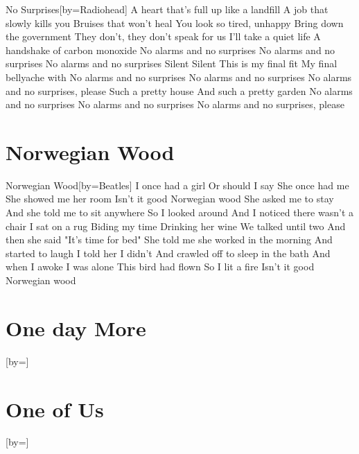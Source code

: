 \documentclass{article}
\begin{document}
\begin{songs}{}
\begin{song}{No Surprises}[by={Radiohead}]
\beginverse
A heart that's full up like a landfill
A job that slowly kills you
Bruises that won't heal
\endverse
\beginverse
You look so tired, unhappy
Bring down the government
They don't, they don't speak for us
\endverse
\beginverse
I'll take a quiet life
A handshake of carbon monoxide
No alarms and no surprises
No alarms and no surprises
No alarms and no surprises
Silent
Silent
\endverse
\beginverse
This is my final fit
My final bellyache with
No alarms and no surprises
No alarms and no surprises
No alarms and no surprises, please
\endverse
\beginverse
Such a pretty house
And such a pretty garden
No alarms and no surprises
No alarms and no surprises
No alarms and no surprises, please
\endverse
\end{song}

\section{Norwegian Wood}

\begin{song}{Norwegian Wood}[by={Beatles}]
\beginverse
I once had a girl
Or should I say
She once had me
\endverse
\beginverse
She showed me her room
Isn't it good
Norwegian wood
\endverse
\beginverse
She asked me to stay
And she told me to sit anywhere
So I looked around
And I noticed there wasn't a chair
\endverse
\beginverse
I sat on a rug
Biding my time
Drinking her wine
\endverse
\beginverse
We talked until two
And then she said
"It's time for bed"
\endverse
\beginverse
She told me she worked in the morning
And started to laugh
I told her I didn't
And crawled off to sleep in the bath
\endverse
\beginverse
And when I awoke
I was alone
This bird had flown
\endverse
\beginverse
So I lit a fire
Isn't it good
Norwegian wood
\endverse
\end{song}

\section{One day More}
\begin{song}{}[by={}]
\beginverse

\endverse
\end{song}

\section{One of Us}
\begin{song}{}[by={}]
\beginverse


\end{song}
\end{songs}
\end{document}
